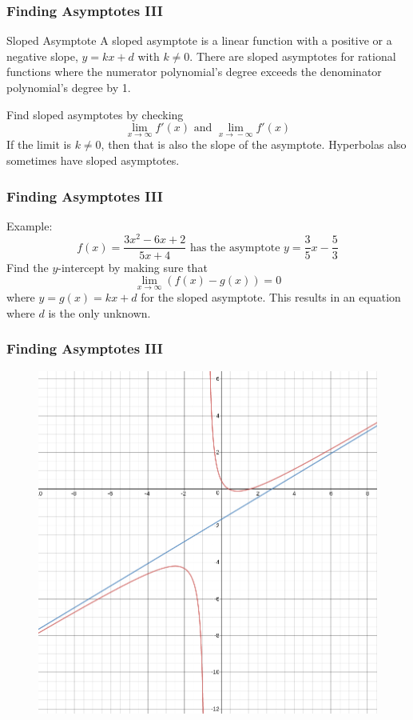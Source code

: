 \documentclass[xcolor=dvipsnames]{beamer}
\begin{document}
\begin{frame}
  \frametitle{Finding Asymptotes III}
\begin{block}{Sloped Asymptote}
  A sloped asymptote is a linear function with a positive or a
  negative slope, $y=kx+d$ with $k\neq{}0$. There are sloped
  asymptotes for rational functions where the numerator polynomial's
  degree exceeds the denominator polynomial's degree by 1.
\end{block}
Find sloped asymptotes by checking
\begin{equation}
  \label{eq:uzuwooba}
  \lim_{x\rightarrow\infty}f'(x)\mbox{ and }\lim_{x\rightarrow{}-\infty}f'(x)
\end{equation}
If the limit is $k\neq{}0$, then that is also the slope of the
asymptote. Hyperbolas also sometimes have sloped asymptotes. 
\end{frame}

\begin{frame}
  \frametitle{Finding Asymptotes III}
Example:
\begin{equation}
  \label{eq:iboohoht}
  f(x)=\frac{3x^{2}-6x+2}{5x+4}\mbox{ has the asymptote }y=\frac{3}{5}x-\frac{5}{3}
\end{equation}
Find the $y$-intercept by making sure that
\begin{equation}
  \label{eq:roojogai}
  \lim_{x\rightarrow\infty}\left(f(x)-g(x)\right)=0
\end{equation}
where $y=g(x)=kx+d$ for the sloped asymptote. This results in an
equation where $d$ is the only unknown.
\end{frame}

\begin{frame}
  \frametitle{Finding Asymptotes III}
\begin{figure}[h]
\includegraphics[scale=.35]{./diagrams/asymp5.png}
\end{figure}
\end{frame}
\end{document}
